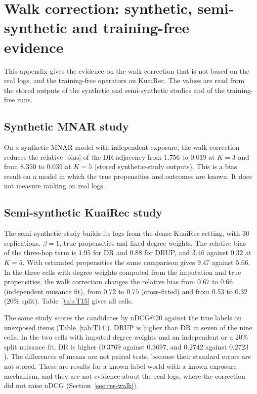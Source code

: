 \section{Walk correction: synthetic, semi-synthetic and training-free evidence}\label{app:walk}

This appendix gives the evidence on the walk correction that is not based on the real logs, and the training-free
operators on KuaiRec. The values are read from the stored outputs of the synthetic and semi-synthetic studies and of the
training-free runs.

\subsection{Synthetic MNAR study}

On a synthetic MNAR model with independent exposure, the walk correction reduces the relative $|\mathrm{bias}|$ of the
DR adjacency from $1.756$ to $0.019$ at $K=3$ and from $8.350$ to $0.039$ at $K=5$ (stored synthetic-study outputs).
This is a bias result on a model in which the true propensities and outcomes are known. It does not measure ranking on
real logs.

\subsection{Semi-synthetic KuaiRec study}

The semi-synthetic study builds its logs from the dense KuaiRec setting, with 30 replications, $\beta=1$, true
propensities and fixed degree weights. The relative bias of the three-hop term is $1.95$ for DR and $0.88$ for DRUP,
and $3.46$ against $0.32$ at $K=5$. With estimated propensities the same comparison gives $9.47$ against $5.66$. In the
three cells with degree weights computed from the imputation and true propensities, the walk correction changes the
relative bias from $0.67$ to $0.66$ (independent nuisance fit), from $0.72$ to $0.75$ (cross-fitted) and from $0.53$ to
$0.32$ (20\% split). Table~\ref{tab:T15} gives all cells.

The same study scores the candidates by nDCG@20 against the true labels on unexposed items (Table~\ref{tab:T14}). DRUP
is higher than DR in seven of the nine cells. In the two cells with imputed degree weights and an independent or a
20\% split nuisance fit, DR is higher ($0.3769$ against $0.3697$, and $0.2742$ against $0.2723$). The differences of
means are not paired tests, because their standard errors are not stored. These are results for a known-label world
with a known exposure mechanism, and they are not evidence about the real logs, where the correction did not raise
nDCG (Section~\ref{sec:res-walk}).

